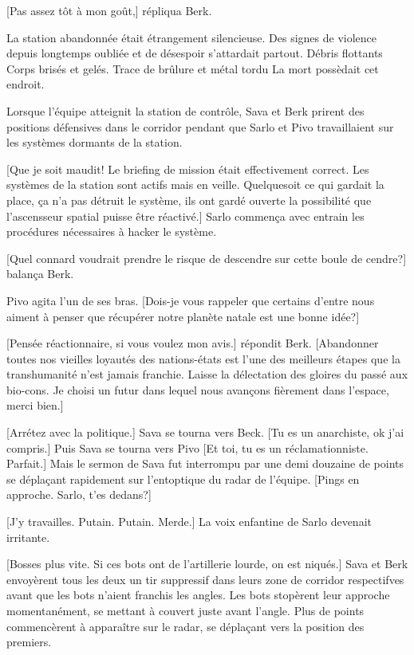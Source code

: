 [Pas assez tôt à mon goût,] répliqua Berk. 

La station abandonnée était étrangement silencieuse. Des signes de violence depuis longtemps oubliée et de désespoir s'attardait partout. Débris flottants Corps brisés et gelés. Trace de brûlure et métal tordu La mort possèdait cet endroit. 

Lorsque l'équipe atteignit la station de contrôle, Sava et Berk prirent des positions défensives dans le corridor pendant que Sarlo et Pivo travaillaient sur les systèmes dormants de la station. 

[Que je soit maudit! Le briefing de mission était effectivement correct. Les systèmes de la station sont actifs mais en veille. Quelquesoit ce qui gardait la place, ça n'a pas détruit le système, ils ont gardé ouverte la possibilité que l'ascensseur spatial puisse être réactivé.] Sarlo commença avec entrain les procédures nécessaires à hacker le système. 

[Quel connard voudrait prendre le risque de descendre sur cette boule de cendre?] balança Berk. 

Pivo agita l'un de ses bras. [Dois-je vous rappeler que certains d'entre nous aiment à penser que récupérer notre planète natale est une bonne idée?] 

[Pensée réactionnaire, si vous voulez mon avis.] répondit Berk. [Abandonner toutes nos vieilles loyautés des nations-états est l'une des meilleurs étapes que la transhumanité n'est jamais franchie. Laisse la délectation des gloires du passé aux bio-cons. Je choisi un futur dans lequel nous avançons fièrement dans l'espace, merci bien.] 

[Arrétez avec la politique.] Sava se tourna vers Beck. [Tu es un anarchiste, ok j'ai compris.] Puis Sava se tourna vers Pivo [Et toi, tu  es un réclamationniste. Parfait.] Mais le sermon de Sava fut interrompu par une demi douzaine de points se déplaçant rapidement sur l'entoptique du radar de l'équipe. [Pings en approche. Sarlo, t'es dedans?] 

[J'y travailles. Putain. Putain. Merde.] La voix enfantine de Sarlo devenait irritante. 

[Bosses plus vite. Si ces bots ont de l'artillerie lourde, on est niqués.] Sava et Berk envoyèrent tous les deux un tir suppressif dans leurs zone de corridor respectifves avant que les bots n'aient franchis les angles. Les bots stopèrent leur approche momentanément, se mettant à couvert juste avant l'angle. Plus de points commencèrent à apparaître sur le radar, se déplaçant vers la position des premiers. 

